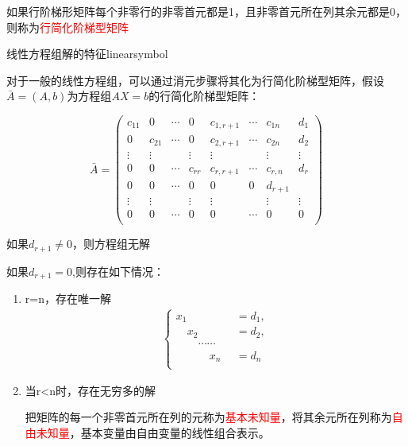 如果行阶梯形矩阵每个非零行的非零首元都是1，且非零首元所在列其余元都是0，则称为\textcolor{red}{行简化阶梯型矩阵}

\begin{theorem}{线性方程组解的特征}{linearsymbol}

    \begin{center}
    \end{center}

    对于一般的线性方程组，可以通过消元步骤将其化为行简化阶梯型矩阵，假设$\bar A=(A,b)$为方程组$AX=b$的行简化阶梯型矩阵：

\begin{equation*}
        \bar A=\begin{pmatrix}
            c_{11}&0&\cdots&0&c_{1,r+1}&\cdots&c_{1n}&d_1\\
            0&c_{21}&\cdots&0&c_{2,r+1}&\cdots&c_{2n}&d_2\\
            \vdots&\vdots&\ &\vdots&\vdots&\ &\vdots&\vdots\\
            0&0&\cdots&c_{rr}&c_{r,r+1}&\cdots&c_{r,n}&d_{r}\\
            0&0&\cdots&0&0&0&d_{r+1}\\
            \vdots&\vdots&\ &\vdots&\vdots&\ &\vdots&\vdots\\
            0&0&\cdots&0&0&\cdots&0&0\\
        \end{pmatrix}
\end{equation*}

如果$d_{r+1}\neq 0$，则方程组无解

如果$d_{r+1}=0$,则存在如下情况：

\begin{enumerate}
    \item r=n，存在唯一解
    $$
    \begin{aligned}
        \begin{cases}
            x_1\quad \quad \quad &=d_1,\\
            \quad x_2\quad \quad &=d_2,\\
            \quad \quad \cdots\cdots\quad &\\
            \quad\quad \quad  x_n&=d_n\\
        \end{cases}
    \end{aligned}
    $$

    \item 当r<n时，存在无穷多的解

    把矩阵的每一个非零首元所在列的元称为\textcolor{red}{基本未知量}，将其余元所在列称为\textcolor{red}{自由未知量}，基本变量由自由变量的线性组合表示。
\end{enumerate}
\end{theorem}

